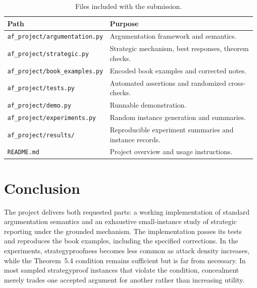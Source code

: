 \documentclass[11pt,a4paper]{article}
\newcommand{\code}[1]{\texttt{\small #1}}
\begin{document}
\begin{table}[ht]
\centering
\small
\begin{tabularx}{\textwidth}{@{}lX@{}}
\toprule
\textbf{Path} & \textbf{Purpose}\\
\midrule
\code{af\_project/argumentation.py} & Argumentation framework and semantics.\\
\code{af\_project/strategic.py} & Strategic mechanism, best responses, theorem checks.\\
\code{af\_project/book\_examples.py} & Encoded book examples and corrected notes.\\
\code{af\_project/tests.py} & Automated assertions and randomized cross-checks.\\
\code{af\_project/demo.py} & Runnable demonstration.\\
\code{af\_project/experiments.py} & Random instance generation and summaries.\\
\code{af\_project/results/} & Reproducible experiment summaries and instance records.\\
\code{README.md} & Project overview and usage instructions.\\
\end{tabularx}
\caption{Files included with the submission.}
\end{table}

\section{Conclusion}
The project delivers both requested parts: a working implementation of standard argumentation semantics and an exhaustive small-instance study of strategic reporting under the grounded mechanism. The implementation passes its tests and reproduces the book examples, including the specified corrections. In the experiments, strategyproofness becomes less common as attack density increases, while the Theorem~5.4 condition remains sufficient but is far from necessary. In most sampled strategyproof instances that violate the condition, concealment merely trades one accepted argument for another rather than increasing utility.
\end{document}
